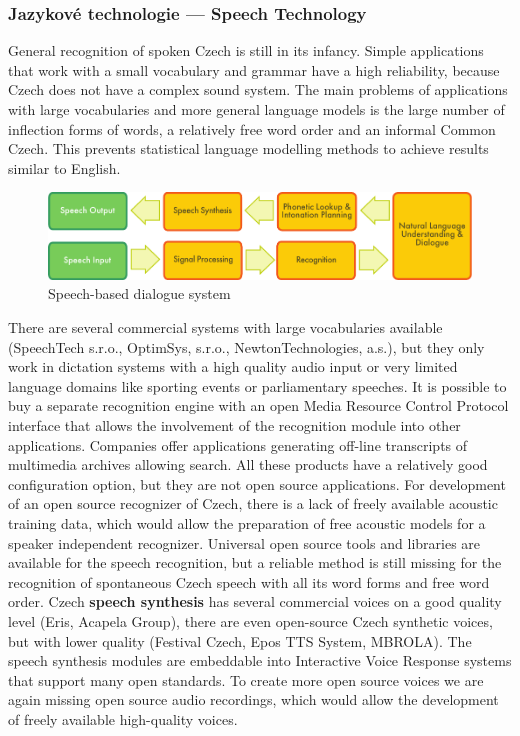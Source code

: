 \documentclass[]{../../metanetpaper}
\begin{document}
\begin{multicols}{2}
\subsubsection{Jazykové technologie --- Speech Technology}

General recognition of spoken Czech is still in its infancy. Simple applications that work with a small vocabulary and grammar have a high reliability, because Czech does not have a complex sound system. The main problems of applications with large vocabularies and more general language models is the large number of inflection forms of words, a relatively free word order and an informal Common Czech. This prevents statistical language modelling methods to achieve results similar to English.

 \begin{figure}[htb]
  \center
  \includegraphics[width=\textwidth]{../_media/english/simple_speech-based_dialogue_architecture}
  \caption{Speech-based dialogue system}
  \label{fig:dialoguearch_en}
\end{figure}

There are several commercial systems with large vocabularies available (SpeechTech s.r.o.\cite{Note11}, OptimSys, s.r.o.\cite{Note12}, NewtonTechnologies, a.s.\cite{Note13}), but they only work in dictation systems with a high quality audio input or very limited language domains like sporting events or parliamentary speeches. It is possible to buy a separate recognition engine with an open Media Resource Control Protocol  interface that allows the involvement of the recognition module into other applications. Companies offer applications generating off-line transcripts of multimedia archives allowing search. All these products have a relatively good configuration option, but they are not open source applications. For development of an open source recognizer of Czech, there is a lack of freely available acoustic training data, which would allow the preparation of free acoustic models for a speaker independent recognizer. Universal open source tools and libraries are available for the speech recognition, but a reliable method is still missing for the recognition of spontaneous Czech speech with all its word forms and free word order.
Czech \textbf{speech synthesis} has several commercial voices on a good quality level (Eris\cite{Note11}, Acapela Group\cite{Note14}), there are even open-source Czech synthetic voices, but with lower quality (Festival Czech\cite{Note15}, Epos TTS System\cite{Note16}, MBROLA\cite{Note17}). The speech synthesis modules are embeddable into Interactive Voice Response systems that support many open standards. To create more open source voices we are again missing open source audio recordings, which would allow the development of freely available high-quality voices.


\end{multicols}
\end{document}
